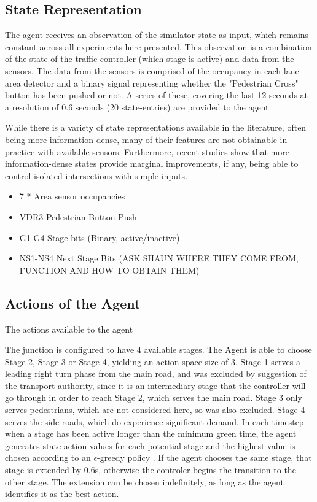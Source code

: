 \documentclass[conference]{IEEEtran}
\begin{document}
\subsection{State Representation}
The agent receives an observation of the simulator state as input, which remains constant across all experiments here presented.
This observation is a combination of the state of the traffic controller (which stage is active) and data from the sensors.
The data from the sensors is comprised of the occupancy in each lane area detector and a binary signal representing whether the "Pedestrian Cross" button has been pushed or not.
A series of these, covering the last 12 seconds at a resolution of 0.6 seconds (20 state-entries) are provided to the agent.

While there is a variety of state representations available in the literature, often being more information dense, many of their features are not obtainable in practice with available sensors.
Furthermore, recent studies \cite{genders2018} show that more information-dense states provide marginal improvements, if any, being able to control isolated intersections with simple inputs.

\begin{itemize}
\item 7 * Area sensor occupancies
\item VDR3 Pedestrian Button Push
\item G1-G4 Stage bits (Binary, active/inactive)
\item NS1-NS4 Next Stage Bits (ASK SHAUN WHERE THEY COME FROM, FUNCTION AND HOW TO OBTAIN THEM)
\end{itemize}

\subsection{Actions of the Agent}
The actions available to the agent

The junction is configured to have 4 available stages. 
The Agent is able to choose Stage 2, Stage 3 or Stage 4, yielding an action space size of 3.
Stage 1 serves a leading right turn phase from the main road, and was excluded by suggestion of the transport authority, since it is an intermediary stage that the controller will go through in order to reach Stage 2, which serves the main road.
Stage 3 only serves pedestrians, which are not considered here, so was also excluded.
Stage 4 serves the side roads, which do experience significant demand.
In each timestep when a stage has been active longer than the minimum green time, the agent generates state-action values for each potential stage and the highest value is chosen according to an $\epsilon$-greedy policy \cite{suttonbarto}. If the agent chooses the same stage, that stage is extended by 0.6s, otherwise the controler begins the transition to the other stage.
The extension can be chosen indefinitely, as long as the agent identifies it as the best action.
\end{document}
